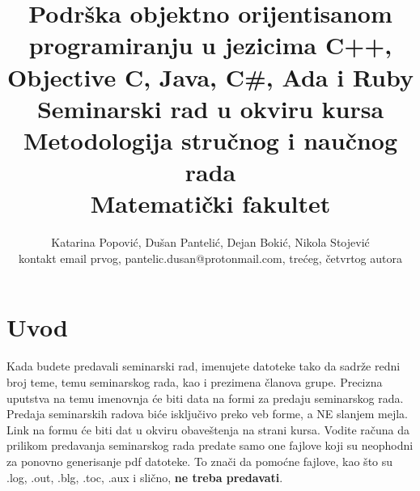 \documentclass[a4paper]{article}
\begin{document}
\title{\Large Podrška objektno orijentisanom programiranju u jezicima C++, Objective C, Java, C\#, Ada i Ruby\\ \small{Seminarski rad u okviru kursa\\Metodologija stručnog i naučnog rada\\ Matematički fakultet}}

\author{Katarina Popović, Dušan Pantelić, Dejan Bokić, Nikola Stojević\\ kontakt email prvog, pantelic.dusan@protonmail.com, trećeg, četvrtog autora}


\maketitle


\tableofcontents

\newpage

\section{Uvod}
\label{sec:uvod}

Kada budete predavali seminarski rad, imenujete datoteke tako da sadrže redni broj teme, temu seminarskog rada, kao i prezimena članova grupe. Precizna uputstva na temu imenovnja će biti data na formi za predaju seminarskog rada. Predaja seminarskih radova biće isključivo preko veb forme, a NE slanjem mejla. Link na formu će biti dat u okviru obaveštenja na strani kursa. Vodite računa da prilikom predavanja seminarskog rada predate samo one fajlove koji su neophodni za ponovno generisanje pdf datoteke. To znači da pomoćne fajlove, kao što su .log, .out, .blg, .toc, .aux i slično, \textbf{ne treba predavati}.
\end{document}
